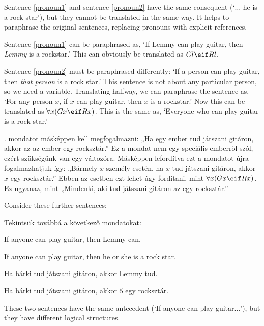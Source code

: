 Sentence \ref{pronoun1} and sentence \ref{pronoun2} have the same consequent (`$\ldots$ he is a rock star'), but they cannot be translated in the same way. It helps to paraphrase the original sentences, replacing pronouns with explicit references.

Sentence \ref{pronoun1} can be paraphrased as, `If Lemmy can play guitar, then \emph{Lemmy} is a rockstar.' This can obviously be translated as $Gl \eif Rl$.



Sentence \ref{pronoun2} must be paraphrased differently: `If a person can play guitar, then \emph{that person} is a rock star.' This sentence is not about any particular person, so we need a variable. Translating halfway, we can paraphrase the sentence as, `For any person $x$, if $x$ can play guitar, then $x$ is a rockstar.' Now this can be translated as $\forall x (Gx \eif Rx)$. This is the same as, `Everyone who can play guitar is a rock star.'

. mondatot másképpen kell megfogalmazni: „Ha egy ember tud játszani gitáron, akkor az az ember egy rocksztár.” Ez a mondat nem egy speciális emberről szól, ezért szükségünk van egy változóra. Másképpen lefordítva ezt a mondatot újra fogalmazhatjuk így: „Bármely $x$ személy esetén, ha $x$ tud játszani gitáron, akkor $x$ egy rocksztár.” Ebben az esetben ezt lehet úgy fordítani, mint $\forall x (Gx \eif Rx)$. Ez ugyanaz, mint „Mindenki, aki tud játszani gitáron az egy rocksztár.”


Consider these further sentences:

Tekintsük továbbá a következő mondatokat:


\begin{earg}
\item[\ex{anyone1}] If anyone can play guitar, then Lemmy can.
\item[\ex{anyone2}] If anyone can play guitar, then he or she is a rock star.
\end{earg}

\begin{earg}
\item[\ex{anyone1}] Ha bárki tud játszani gitáron, akkor Lemmy tud.
\item[\ex{anyone2}] Ha bárki tud játszani gitáron, akkor ő egy rocksztár.
\end{earg}

These two sentences have the same antecedent (`If anyone can play guitar$\ldots$'), but they have different logical structures.

